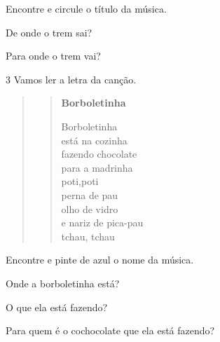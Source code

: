 \begin{escolha}
\item  Encontre e circule o título da música.

\item De onde o trem sai?


\item Para onde o trem vai?

\end{escolha}

\num{3} Vamos ler a letra da canção.\enlargethispage{2\baselineskip}


\begin{quote}
\begin{verse}
\textbf{Borboletinha}

Borboletinha\\
está na cozinha\\
fazendo chocolate\\
para a madrinha\\
poti,poti\\
perna de pau\\
olho de vidro\\
e nariz de pica-pau\\
tchau, tchau
\end{verse}

\end{quote}

\begin{escolha}
\item Encontre e pinte de azul o nome da música.

\item Onde a borboletinha está?


\item O que ela está fazendo?


\item Para quem é o cochocolate que ela está fazendo?

\end{escolha}

